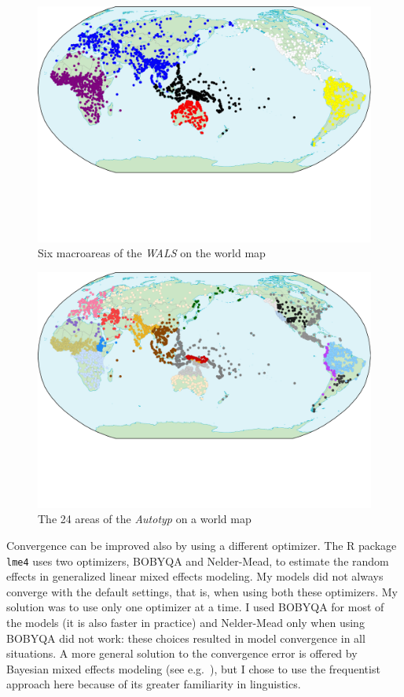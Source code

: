 \documentclass[output=collectionpaper]{langsci/langscibook}
\begin{document}
\begin{figure}
\includegraphics[width=\textwidth]{figures/13/Fig7_Map6areas_s}
\caption{Six macroareas of the \textit{WALS} on the world map}
\label{fig:Sinne:7}
\end{figure}

\begin{figure}
\includegraphics[width=\textwidth]{figures/13/Fig8_Map24areas_s}
\caption{The 24 areas of the \textit{Autotyp} on a world map}
\label{fig:Sinne:8}
\end{figure}

Convergence can be improved also by using a different optimizer. The R package \texttt{lme4} \citep{Bates2015} uses two optimizers, BOBYQA and Nelder-Mead, to estimate the random effects in generalized linear mixed effects modeling. My models did not always converge with the default settings, that is, when using both these optimizers. My solution was to use only one optimizer at a time. I used BOBYQA for most of the models (it is also faster in practice) and Nelder-Mead only when using BOBYQA did not work: these choices resulted in model convergence in all situations. A more general solution to the convergence error is offered by Bayesian mixed effects modeling (see e.g.\ \citealt{Kimballsubmitted}), but I chose to use the frequentist approach here because of its greater familiarity in linguistics.
\end{document}
